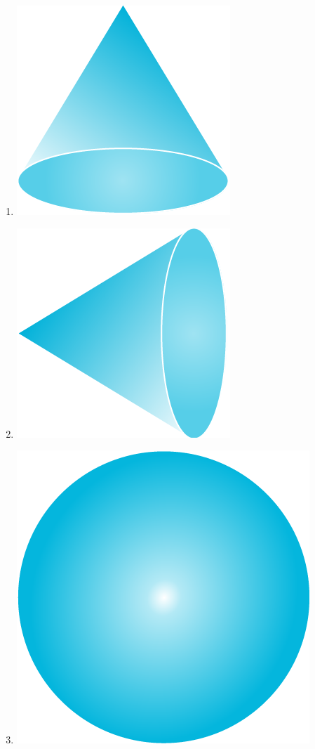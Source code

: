 \documentclass{officialexam}
\begin{document}
\begin{enumerate}[I]
\begin{enumerate}[m]
\begin{multicols}{4}
\begin{enumerate}[bk]
					\item \includegraphics[scale=1]{06}
					\item \includegraphics[scale=1]{07}
					\item \includegraphics[scale=0.7]{08}

\end{enumerate}
\end{multicols}
\end{enumerate}
\end{enumerate}
\end{document}
